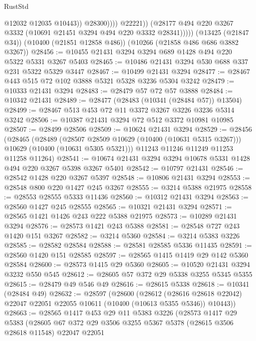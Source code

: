\begin{lexlean}{RustStd}
\begin{coremodule}
                          @12032
                          @12035
                          @10443))
                      @28300))))
              @22221))
          (@28177 @494 @220 @3267 @3332 (@10691 @21451 @3294 @494 @220 @3332 @28341)))))
    (@13425 (@21847 @34))
    (@10400 (@21851 @12858 @486))
    (@10266 (@21858 @486 @686 @3882 @3267))
@28456 := @10455 @21431 @3294 @3294 @689 @1428 @494 @220 @5322 @5331 @3267 @5403
@28465 := @10486 @21431 @3294 @530 @688 @337 @231 @5322 @5329 @3447
@28467 := @10499 @21431 @3294
@28477 := @28467 @443 @515 @72 @102 @3888 @5321 @5328 @3236 @5304 @3242
@28479 := @10333 @21431 @3294
@28483 := @28479 @57 @72 @57 @3888
@28484 := @10342 @21431
@28489 := @28477 (@28483 (@10341 (@28484 @57)) @13504)
@28499 := @28467 @513 @453 @72 @11 @3372 @3267 @3226 @3236 @5314 @3242
@28506 := @10387 @21431 @3294 @72 @512 @3372 @10981 @10985
@28507 := @28499 @28506
@28509 := @10624 @21431 @3294
@28529 := @28456
    (@28465
      (@28489
        (@28507 @28509 @10629 (@10400 (@10631 @5315 @3267)))
        @10629
        (@10400 (@10631 @5305 @5321)))
      @11243
      @11246
      @11249
      @11253
      @11258
      @11264)
@28541 := @10674 @21431 @3294 @3294 @10678 @5331 @1428 @494 @220 @3267 @5398 @3267 @5401
@28542 := @10797 @21431
@28546 := @28542 @1428 @220 @3267 @5397
@28548 := @10806 @21431 @3294
@28553 := @28548 @800 @220 @1427 @245 @3267
@28555 := @3214 @5388 @21975
@28558 := @28553 @28555 @5333 @11436
@28560 := @10312 @21431 @3294
@28563 := @28560 @1427 @245 @28555
@28565 := @10321 @21431 @3294
@28571 := @28565 @1421 @1426 @243 @222 @5388 @21975
@28573 := @10289 @21431 @3294
@28576 := @28573 @1421 @243 @5388
@28581 := @28548 @727 @243 @1420 @151 @3267
@28582 := @3214 @5360
@28584 := @3214 @5383 @3226
@28585 := @28582 @28584
@28588 := @28581 @28585 @5336 @11435
@28591 := @28560 @1420 @151 @28585
@28597 := @28565 @1415 @1419 @29 @142 @5360 @28584
@28600 := @28573 @1415 @29 @5360
@28605 := @10520 @21431 @3294 @3232 @550 @545
@28612 := @28605 @57 @372 @29 @5338 @3255 @5345 @5355
@28615 := @28479 @49 @546 @49
@28616 := @28615 @5338
@28618 := @10341 (@28484 @49)
@28632 := @28597
    (@28600
      (@28612
        (@28616 @28618 @22042)
        @22047
        @22051
        @22055
        @10611
        (@10400 (@10613 @5355 @5346))
        @10443))
@28663 := @28565
    @1417
    @453
    @29
    @11
    @5383
    @3226
    (@28573
      @1417
      @29
      @5383
      (@28605
        @67
        @372
        @29
        @3506
        @3255
        @5367
        @5378
        (@28615 @3506 @28618 @11548)
        @22047
        @22051

\end{coremodule}
\end{lexlean}
